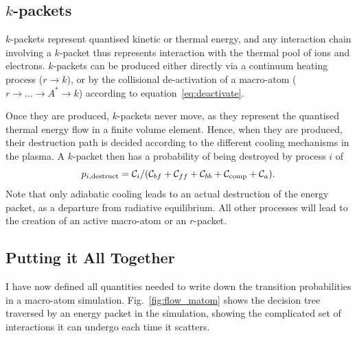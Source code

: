 \noindent

\subsection{$k$-packets}
$k$-packets represent quantised kinetic or thermal energy, and any interaction
chain involving a $k$-packet thus represents interaction with the thermal
pool of ions and electrons. $k$-packets can be produced either directly
via a continuum heating process ($r \rightarrow k$), 
or by the collisional de-activation of a macro-atom 
($r \rightarrow \ldots \rightarrow A^* \rightarrow k$) according to equation~\ref{eq:deactivate}. 

Once they are produced, $k$-packets never move, as they represent the quantised
thermal energy flow in a finite volume element. Hence, when they are produced,
their destruction path is decided according to the different cooling mechanisms
in the plasma. A $k$-packet then has a probability of being destroyed by process $i$ of
\begin{equation}
p_{i,\mathrm{destruct}} = {\cal C}_i / ({\cal C}_{bf} + {\cal C}_{ff} + {\cal C}_{bb} + {\cal C}_{\mathrm{comp}} + {\cal C}_a).
\end{equation}
Note that only adiabatic cooling leads to an actual destruction of the energy packet,
as a departure from radiative equilibrium. All other processes will lead to the 
creation of an active macro-atom or an $r$-packet.



\subsection{Putting it All Together}

I have now defined all quantities needed to write down the transition 
probabilities in a macro-atom simulation. Fig.~\ref{fig:flow_matom}
shows the decision tree traversed by an energy packet in the simulation,
showing the complicated set of interactions it can undergo each time it 
scatters.

